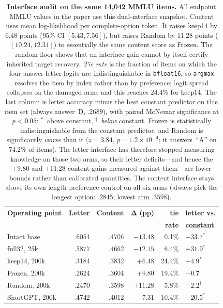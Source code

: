 \begin{table}[t]
\centering
\scriptsize
\setlength{\tabcolsep}{3.2pt}
\begin{tabular}{@{}lrrrrl@{}}
\toprule
\textbf{Operating point} & \textbf{Letter} & \textbf{Content} &
$\boldsymbol{\Delta}$ \textbf{(pp)} & \textbf{tie} & \textbf{letter vs.} \\
& & & & \textbf{rate} & \textbf{constant} \\
\midrule
Intact base & .6054 & .4706 & $-13.48$ & 0.1\% & $+33.7^{\ast}$ \\
full32, 25k & .5877 & .4662 & $-12.15$ & 6.4\% & $+31.9^{\ast}$ \\
keep14, 200k & .3184 & .3832 & $+6.48$ & 24.4\% & $+4.9^{\ast}$ \\
Frozen, 200k & .2624 & .3604 & $+9.80$ & 19.4\% & $-0.7$ \\
Random, 200k & .2470 & .3598 & $+11.28$ & 5.8\% & $-2.2^{\dagger}$ \\
ShortGPT, 200k & .4742 & .4012 & $-7.31$ & 10.4\% & $+20.5^{\ast}$ \\
\bottomrule
\end{tabular}
\caption{\textbf{Interface audit on the same 14,042 MMLU items.}
All endpoint MMLU values in the paper use this dual-interface snapshot. Content uses
mean log-likelihood per complete-option token. It raises keep14 by 6.48 points
(95\% CI $[5.43,7.56]$), but raises Random by 11.28 points
($[10.24,12.31]$) to essentially the same content score as Frozen. The random
floor shows that an interface gain cannot by itself certify inherited target
recovery.
\emph{Tie rate} is the fraction of items on which the four answer-letter logits
are indistinguishable in \texttt{bfloat16}, so \texttt{argmax} resolves the item
by index rather than by preference; logit spread collapses on the damaged arms
and this reaches 24.4\% for keep14. The last column is letter accuracy minus the
best constant predictor on this item set (always answer~D, $.2689$), with paired
McNemar significance at $p<0.05$: $^{\ast}$~above constant,
$^{\dagger}$~\emph{below} constant. Frozen is statistically indistinguishable
from the constant predictor, and Random is significantly \emph{worse} than it
($z=3.84$, $p=1.2\times10^{-4}$; it answers~``A'' on 74.2\% of items). The
letter interface has therefore stopped measuring knowledge on those two arms, so
their letter deficits---and hence the $+9.80$ and $+11.28$ content gains
measured against them---are lower bounds rather than calibrated quantities. The
content interface stays above its own length-preference control on all six arms
(always pick the longest option: $.2845$; lowest arm $.3598$).}
\label{tab:interface-audit}
\end{table}
